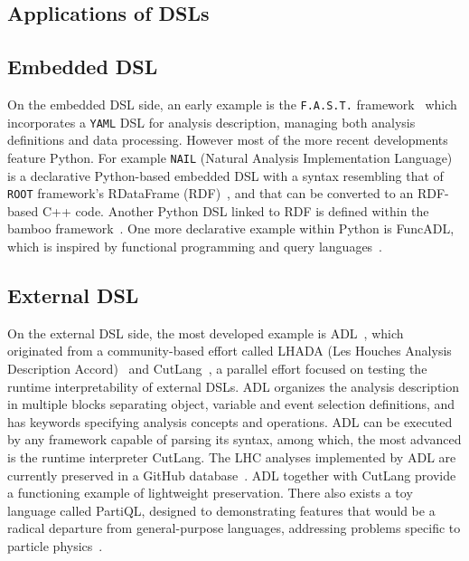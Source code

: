 \documentclass[11pt]{article}
\begin{document}
\begin{appendices}

    \section{Applications of DSLs}
    \label{app:dsl}
    \subsection{Embedded DSL}
    On the embedded \gls{DSL} side, an early example is the \texttt{F.A.S.T.} framework~\cite{FAST} which incorporates a \texttt{YAML} \gls{DSL} for analysis description, managing both analysis definitions and data processing. However most of the more recent developments feature Python.
    For example \texttt{NAIL} (Natural Analysis Implementation Language)~\cite{NAIL} is a declarative Python-based embedded \gls{DSL} with a syntax resembling that of \texttt{ROOT} framework's RDataFrame (RDF)~\cite{enrico_guiraud_2017_260230}, and that can be converted to an RDF-based C++ code.
    Another Python \gls{DSL} linked to RDF is defined within the bamboo framework~\cite{David:2021ohq}.
    One more declarative example within Python is FuncADL, which is inspired by functional programming and query languages~\cite{Proffitt:2021wfh}.
    
    \subsection{External DSL}
    On the external \gls{DSL} side, the most developed example is \gls{ADL}~\cite{adlweb, Unel:2021edl}, which originated from a community-based effort called LHADA (Les Houches Analysis Description Accord)~\cite{Brooijmans:2016vro} and CutLang~\cite{Sekmen:2018ehb}, a parallel effort focused on testing the runtime interpretability of external \glspl{DSL}.
    \gls{ADL} organizes the analysis description in multiple blocks separating object, variable and event selection definitions, and has keywords specifying analysis concepts and operations. 
    \gls{ADL} can be executed by any framework capable of parsing its syntax, among which, the most advanced is the runtime interpreter CutLang. The \gls{LHC} analyses implemented by \gls{ADL} are currently preserved in a GitHub database~\cite{adllhcanl}.
    \gls{ADL} together with CutLang provide a functioning example of lightweight preservation.
    There also exists a toy language called PartiQL, designed to demonstrating features that would be a radical departure from general-purpose languages, addressing problems specific to particle physics~\cite{PartiQL}. 
    

\end{appendices}
\end{document}
